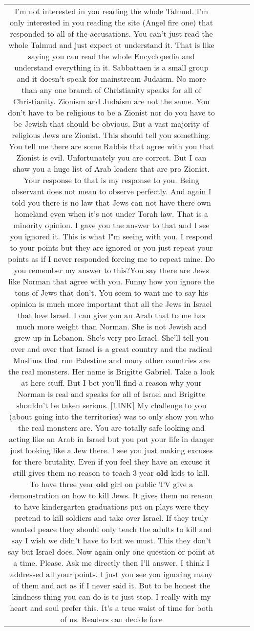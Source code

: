 \documentclass[11pt]{article}
\newlength\mylength
\begin{document}
\begin{center}
\begin{longtable}{|C{.65\mylength}|C{.30\mylength}|C{.12\mylength}|C{.12\mylength}|C{.12\mylength}|}
  \small I'm not interested in you reading the whole Talmud. I'm only interested in you reading the site (Angel fire one) that responded to all of the accusations. You can't just read the whole Talmud and just expect ot understand it. That is like saying you can read the whole Encyclopedia and understand everything in it. Sabbattaen is a small group and it doesn't speak for mainstream Judaism. No more than any one branch of Christianity speaks for all of Christianity. Zionism and Judaism are not the same. You don't have to be religious to be a Zionist nor do you have to be Jewish that should be obvious.  But a vast majority of religious Jews are Zionist. This should tell you something.  You tell me there are some Rabbis that agree with you that Zionist is evil. Unfortunately you are correct. But I can show you a huge list of Arab leaders that are pro Zionist. Your response to that is my response to you. Being observant does not mean to observe perfectly. And again I told you there is no law that Jews can not have there own homeland even when it's not under Torah law. That is a minority opinion. I gave you the answer to that and I see you ignored it. This is what I"m seeing with you. I respond to your points but they are ignored or you just repeat your points as if I never responded forcing me to repeat mine.  Do you remember my answer to this?You say there are Jews like Norman that agree with you. Funny how you ignore the tons of Jews that don't. You seem to want me to say his opinion is much more important that all the Jews in Israel that love Israel.  I can give you an Arab that to me has much more weight than  Norman. She is not Jewish and grew up in Lebanon. She's very pro Israel. She'll tell you over and over that Israel is a great country and the radical  Muslims that run Palestine and many other countries are the real monsters. Her name is Brigitte Gabriel.  Take a look at here stuff. But I bet you'll find a reason why your Norman is real and speaks for all of Israel and Brigitte shouldn't be taken serious.  [LINK] My challenge to you (about going into the territories) was to only show you who the real monsters are. You are totally safe looking and acting like an Arab in Israel but you put your life in danger just looking like a Jew there.  I see you just making excuses for there brutality. Even if you feel they have an excuse it still gives them no reason to teach 3 year \textbf{old} kids to kill. To have three year \textbf{old} girl on public TV give a demonstration on how to kill Jews. It gives them no reason to have kindergarten graduations put on plays were they pretend to kill soldiers and take over Israel.  If they truly wanted peace they should only teach the adults to kill and say I wish we didn't have to but we must. This they don't say but Israel does. Now again only one question or point at a time. Please. Ask me directly then I'll answer. I think I addressed all your points. I just you see you ignoring many of them and act as if I never said it.  But to be honest the kindness thing you can do is to just stop. I really with my heart and soul prefer this. It's a true waist of time for both of us. Readers can decide fore 
\end{longtable}
\end{center}
\end{document}
